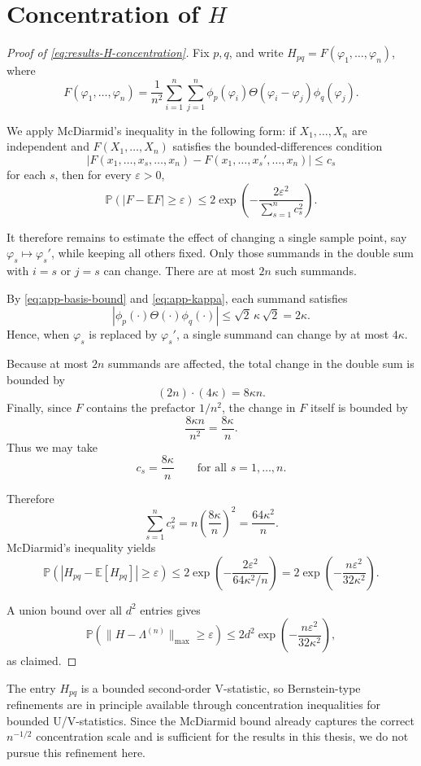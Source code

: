 \section{Concentration of \(H\)}
\label{sec:app-H-proof}

\begin{proof}[Proof of \eqref{eq:results-H-concentration}]
	Fix \(p,q\), and write \(H_{pq}=F(\varphi_1,\dots,\varphi_n)\), where
	\[
		F(\varphi_1,\dots,\varphi_n)
		=
		\frac{1}{n^2}\sum_{i=1}^n\sum_{j=1}^n
		\phi_p(\varphi_i)\Theta(\varphi_i-\varphi_j)\phi_q(\varphi_j).
	\]

	We apply McDiarmid's inequality \citep{Vershynin_2018b} in the following form: if
	\(X_1,\dots,X_n\) are independent and
	\(F(X_1,\dots,X_n)\) satisfies the bounded-differences condition
	\[
		|F(x_1,\dots,x_s,\dots,x_n)-F(x_1,\dots,x_s',\dots,x_n)|\le c_s
	\]
	for each \(s\), then for every \(\varepsilon>0\),
	\[
		\mathbb P\!\left(|F-\mathbb EF|\ge \varepsilon\right)
		\le
		2\exp\!\left(-\frac{2\varepsilon^2}{\sum_{s=1}^n c_s^2}\right).
	\]

	It therefore remains to estimate the effect of changing a single sample point, say
	\(\varphi_s\mapsto \varphi_s'\), while keeping all others fixed.
	Only those summands in the double sum with \(i=s\) or \(j=s\) can change. There are at most
	\(2n\) such summands.

	By \eqref{eq:app-basis-bound} and \eqref{eq:app-kappa}, each summand satisfies
	\[
		|\phi_p(\cdot)\Theta(\cdot)\phi_q(\cdot)|
		\le
		\sqrt2\,\kappa\,\sqrt2
		=
		2\kappa.
	\]
	Hence, when \(\varphi_s\) is replaced by \(\varphi_s'\), a single summand can change by at most \(4\kappa\).

	Because at most \(2n\) summands are affected, the total change in the double sum is bounded by
	\[
		(2n)\cdot (4\kappa)=8\kappa n.
	\]
	Finally, since \(F\) contains the prefactor \(1/n^2\), the change in \(F\) itself is bounded by
	\[
		\frac{8\kappa n}{n^2}=\frac{8\kappa}{n}.
	\]
	Thus we may take
	\[
		c_s=\frac{8\kappa}{n}
		\qquad\text{for all } s=1,\dots,n.
	\]

	Therefore
	\[
		\sum_{s=1}^n c_s^2
		=
		n\left(\frac{8\kappa}{n}\right)^2
		=
		\frac{64\kappa^2}{n}.
	\]
	McDiarmid's inequality yields
	\[
		\mathbb P\!\left(|H_{pq}-\mathbb E[H_{pq}]|\ge \varepsilon\right)
		\le
		2\exp\!\left(
		-\frac{2\varepsilon^2}{64\kappa^2/n}
		\right)
		=
		2\exp\!\left(-\frac{n\varepsilon^2}{32\kappa^2}\right).
	\]

	A union bound over all \(d^2\) entries gives
	\[
		\mathbb P\!\left(\|H-\Lambda^{(n)}\|_{\max}\ge \varepsilon\right)
		\le
		2d^2\exp\!\left(-\frac{n\varepsilon^2}{32\kappa^2}\right),
	\]
	as claimed.
\end{proof}
\begin{remark}
	The entry \(H_{pq}\) is a bounded second-order V-statistic, so Bernstein-type refinements are
	in principle available through concentration inequalities for bounded U/V-statistics. Since the
	McDiarmid bound already captures the correct \(n^{-1/2}\) concentration scale and is sufficient
	for the results in this thesis, we do not pursue this refinement here.
\end{remark}

